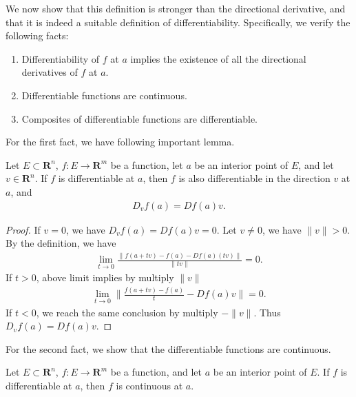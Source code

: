 We now show that this definition is stronger than the directional derivative, and that it is indeed a suitable definition of differentiability. Specifically, we verify the following facts:
\begin{enumerate}
    \item Differentiability of $f$ at $a$ implies the existence of all the directional derivatives of $f$ at $a$.
    \item Differentiable functions are continuous.
    \item Composites of differentiable functions are differentiable.
\end{enumerate}

For the first fact, we have following important lemma.

\begin{lemma}\label{lem:differentiability implies directional derivative}
    Let $E \subset \mathbf{R}^n$, $f : E \to \mathbf{R}^m$ be a function, let $a$ be an interior point of $E$, and let $v \in \mathbf{R}^n$. If $f$ is differentiable at $a$, then $f$ is also differentiable in the direction $v$ at $a$, and
        \begin{align*}
            D_vf(a) = Df(a)v.
        \end{align*}
\end{lemma}

\begin{proof}
    If $v = 0$, we have $D_vf(a) = Df(a)v = 0$. Let $v \neq 0$, we have $\|v\| > 0$. By the definition, we have
        \begin{align*}
            \lim_{t \to 0}\frac{\|f(a + tv) - f(a) - Df(a)(tv)\|}{\|tv\|}
            = 0.
        \end{align*}
    If $t > 0$, above limit implies by multiply $\|v\|$
        \begin{align*}
            \lim_{t \to 0}\Big\|\frac{f(a + tv) - f(a)}{t} - Df(a)v\Big\| = 0.
        \end{align*}
    If $t < 0$, we reach the same conclusion by multiply $-\|v\|$. Thus $D_vf(a) = Df(a)v$.
\end{proof}

For the second fact, we show that the differentiable functions are continuous.

\begin{proposition}
    Let $E \subset \mathbf{R}^n$, $f : E \to \mathbf{R}^m$ be a function, and let $a$ be an interior point of $E$. If $f$ is differentiable at $a$, then $f$ is continuous at $a$.
\end{proposition}

